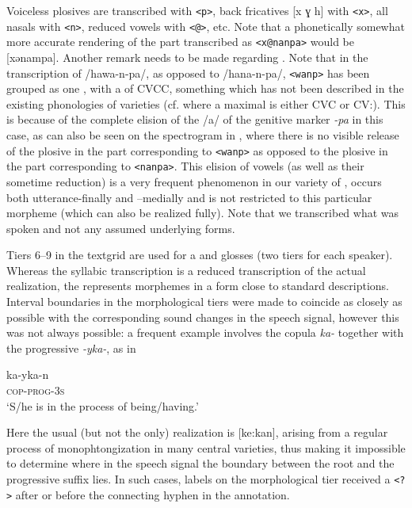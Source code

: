 \documentclass[output=paper]{LSP/langsci}
\begin{document}
Voiceless plosives are transcribed with \texttt{<p>}, back fricatives [x ɣ h] with \texttt{<x>}, all nasals with \texttt{<n>}, reduced vowels with \texttt{<@>}, etc. Note that a phonetically somewhat more accurate rendering of the part transcribed as \texttt{<x@nanpa>} would be [xənampa]. Another remark needs to be made regarding . Note that in the transcription of /hawa-n-pa/, as opposed to /hana-n-pa/, \texttt{<wanp>} has been grouped as one , with a  of CVCC, something which has not been described in the existing phonologies of  varieties (cf. \citealt{Parker1976} where a maximal  is either CVC or CV\textipa:). This is because of the complete elision of the  /a/ of the genitive marker \textit{-pa} in this case, as can also be seen on the spectrogram in , where there is no visible release of the plosive in the part corresponding to \texttt{<wanp>} as opposed to the plosive in the part corresponding to \texttt{<nanpa>}. This elision of vowels (as well as their sometime reduction) is a very frequent phenomenon in our variety of , occurs both utterance-finally and –medially and is not restricted to this particular morpheme (which can also be realized fully). Note that we transcribed what was spoken and not any assumed underlying forms. 

Tiers 6--9 in the textgrid are used for a  and glosses (two tiers for each speaker). Whereas the syllabic transcription is a reduced transcription of the actual realization, the  represents morphemes in a form close to standard descriptions. Interval boundaries in the morphological tiers were made to coincide as closely as possible with the corresponding sound changes in the speech signal, however this was not always possible: a frequent example involves the copula \textit{ka-} together with the progressive \textit{-yka-}, as in 

\ea
\gll ka-yka-n\\
\textsc{cop}-\textsc{prog}-\textsc{3s}\\
\glt `S/he is in the process of being/having.'
\z

Here the usual (but not the only) realization is  [ke\textipa:kan], %
arising from a regular process of monophtongization in many central  varieties, thus making it impossible to determine where in the speech signal the boundary between the root and the progressive suffix lies. In such cases, labels on the morphological tier received a \texttt{<?>} after or before the connecting hyphen in the annotation. 
\end{document}
